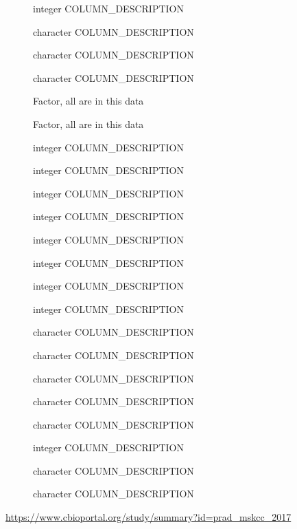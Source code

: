 \documentclass[a4paper]{book}
\begin{document}
\begin{Format}
\begin{description}
\item[] integer COLUMN\_DESCRIPTION
\item[] character COLUMN\_DESCRIPTION
\item[] character COLUMN\_DESCRIPTION
\item[] character COLUMN\_DESCRIPTION
\item[] Factor, all are  in this data
\item[] Factor, all are  in this data
\item[] integer COLUMN\_DESCRIPTION
\item[] integer COLUMN\_DESCRIPTION
\item[] integer COLUMN\_DESCRIPTION
\item[] integer COLUMN\_DESCRIPTION
\item[] integer COLUMN\_DESCRIPTION
\item[] integer COLUMN\_DESCRIPTION
\item[] integer COLUMN\_DESCRIPTION
\item[] integer COLUMN\_DESCRIPTION
\item[] character COLUMN\_DESCRIPTION
\item[] character COLUMN\_DESCRIPTION
\item[] character COLUMN\_DESCRIPTION
\item[] character COLUMN\_DESCRIPTION
\item[] character COLUMN\_DESCRIPTION
\item[] integer COLUMN\_DESCRIPTION
\item[] character COLUMN\_DESCRIPTION
\item[] character COLUMN\_DESCRIPTION

\end{description}

\end{Format}
%
\begin{Source}\relax
\url{https://www.cbioportal.org/study/summary?id=prad_mskcc_2017}
\end{Source}
\end{document}
